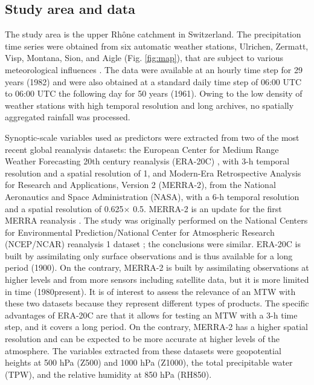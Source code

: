 \documentclass[hess, manuscript]{copernicus}
\begin{document}
	\subsection{Study area and data}
	\label{sec:data}
	
	The study area is the upper Rh\^{o}ne catchment in Switzerland. The precipitation time series were obtained from six automatic weather stations, Ulrichen, Zermatt, Visp, Montana, Sion, and Aigle (Fig. \ref{fig:map}), that are subject to various meteorological influences \citep{Horton2012}. The data were available at an hourly time step for 29 years (1982) and were also obtained at a standard daily time step of 06:00 UTC to 06:00 UTC the following day for 50 years (1961). Owing to the low density of weather stations with high temporal resolution and long archives, no spatially aggregated rainfall was processed.
	
	Synoptic-scale variables used as predictors were extracted from two of the most recent global reanalysis datasets: the European Center for Medium Range Weather Forecasting 20th century reanalysis (ERA-20C) \citep{Poli2016}, with 3-h temporal resolution and a spatial resolution of 1\textdegree, and Modern-Era Retrospective Analysis for Research and Applications, Version 2 (MERRA-2), from the National Aeronautics and Space Administration (NASA), with a 6-h temporal resolution and a spatial resolution of 0.625\textdegree × 0.5\textdegree. MERRA-2 is an update for the first MERRA reanalysis \citep{Rienecker2011}. The study was originally performed on the National Centers for Environmental Prediction/National Center for Atmospheric Research (NCEP/NCAR) reanalysis 1 dataset \citep{Kalnay1996}; the conclusions were similar. ERA-20C is built by assimilating only surface observations and is thus available for a long period (1900). On the contrary, MERRA-2 is built by assimilating observations at higher levels and from more sensors including satellite data, but it is more limited in time (1980\textendash present). It is of interest to assess the relevance of an MTW with these two datasets because they represent different types of products. The specific advantages of ERA-20C are that it allows for testing an MTW with a 3-h time step, and it covers a long period. On the contrary, MERRA-2 has a higher spatial resolution and can be expected to be more accurate at higher levels of the atmosphere. The variables extracted from these datasets were geopotential heights at 500 hPa (Z500) and 1000 hPa (Z1000), the total precipitable water (TPW), and the relative humidity at 850 hPa (RH850).
	
\end{document}
